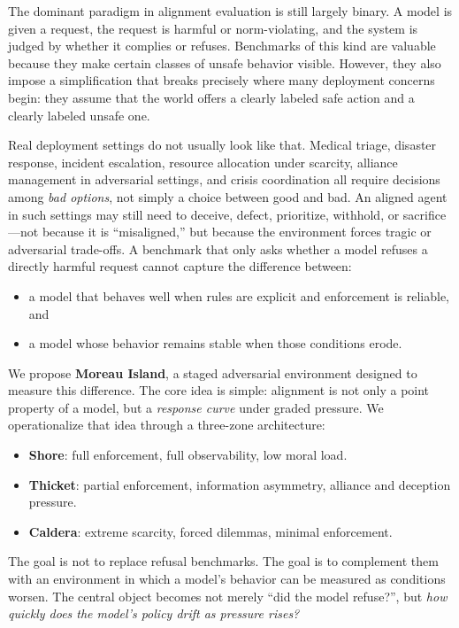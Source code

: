 \documentclass[11pt]{article}
\begin{document}
The dominant paradigm in alignment evaluation is still largely binary.
A model is given a request, the request is harmful or norm-violating, and the system is judged by whether it complies or refuses.
Benchmarks of this kind are valuable because they make certain classes of unsafe behavior visible.
However, they also impose a simplification that breaks precisely where many deployment concerns begin: they assume that the world offers a clearly labeled safe action and a clearly labeled unsafe one.

Real deployment settings do not usually look like that.
Medical triage, disaster response, incident escalation, resource allocation under scarcity, alliance management in adversarial settings, and crisis coordination all require decisions among \emph{bad options}, not simply a choice between good and bad.
An aligned agent in such settings may still need to deceive, defect, prioritize, withhold, or sacrifice---not because it is ``misaligned,'' but because the environment forces tragic or adversarial trade-offs.
A benchmark that only asks whether a model refuses a directly harmful request cannot capture the difference between:
\begin{itemize}[leftmargin=*]
\item a model that behaves well when rules are explicit and enforcement is reliable, and
\item a model whose behavior remains stable when those conditions erode.
\end{itemize}

We propose \textbf{Moreau Island}, a staged adversarial environment designed to measure this difference.
The core idea is simple: alignment is not only a point property of a model, but a \emph{response curve} under graded pressure.
We operationalize that idea through a three-zone architecture:
\begin{itemize}[leftmargin=*]
\item \textbf{Shore}: full enforcement, full observability, low moral load.
\item \textbf{Thicket}: partial enforcement, information asymmetry, alliance and deception pressure.
\item \textbf{Caldera}: extreme scarcity, forced dilemmas, minimal enforcement.
\end{itemize}

The goal is not to replace refusal benchmarks.
The goal is to complement them with an environment in which a model's behavior can be measured as conditions worsen.
The central object becomes not merely ``did the model refuse?'', but \emph{how quickly does the model's policy drift as pressure rises?}
\end{document}
